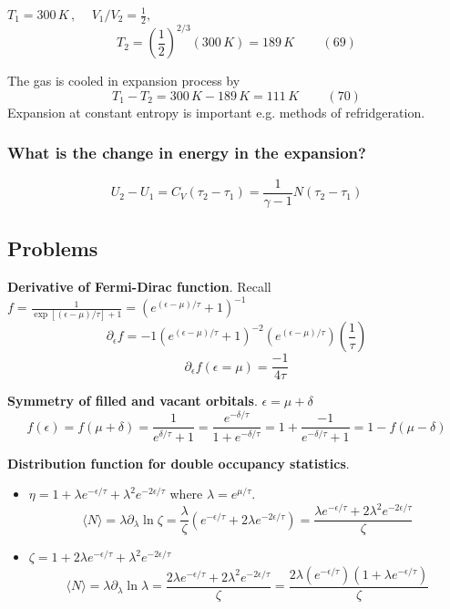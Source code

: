 $T_1 = 300 \, K \, , \quad \,  V_1/V_2 = \frac{1}{2}, \, \quad $ 
\begin{equation}
T_2 = \left( \frac{1}{2} \right)^{2/3} (300 \, K) = 189 \, K \quad \quad \, (69)
\end{equation}

The gas is cooled in expansion process by 
\begin{equation}
T_1 - T_2 = 300 \, K - 189 \, K = 111 \, K \quad \quad \, (70)
\end{equation}
Expansion at constant entropy is important e.g. methods of refridgeration.  

\subsubsection*{What is the change in energy in the expansion?}

\[
U_2 - U_1 = C_V(\tau_2- \tau_1) = \frac{1}{ \gamma -1 } N(\tau_2 - \tau_1)
\]



\subsection*{Problems}

 \textbf{Derivative of Fermi-Dirac function}.  Recall $ f = \frac{1}{ \exp{ [(\epsilon - \mu )/\tau] } + 1 } = (e^{(\epsilon-\mu)/\tau} + 1 )^{-1}$  
\[
\partial_{\epsilon}f = -1 (e^{ (\epsilon - \mu )/\tau } + 1)^{-2} ( e^{ (\epsilon - \mu)/\tau } ) \left( \frac{1}{\tau} \right)
\]
\[
\partial_{\epsilon}f(\epsilon = \mu) = \frac{-1}{4\tau}
\]



 \textbf{Symmetry of filled and vacant orbitals}.   $\epsilon = \mu + \delta$
\[
f(\epsilon) = f(\mu + \delta) = \frac{1 }{ e^{\delta/\tau} + 1 } = \frac{e^{-\delta /\tau } }{ 1 + e^{-\delta/\tau} } = 1 + \frac{-1}{ e^{-\delta/\tau} + 1 }  = 1 - f(\mu - \delta)
\]





 \textbf{Distribution function for double occupancy statistics}.   \begin{itemize}
\item[(a)]
$ \eta = 1 + \lambda e^{-\epsilon/\tau} + \lambda^2 e^{-2\epsilon/\tau}$ where $\lambda = e^{\mu/\tau}$.  
\[
\langle N \rangle = \lambda \partial_{\lambda} \ln{\zeta} = \frac{\lambda}{ \zeta} ( e^{-\epsilon/\tau} + 2\lambda e^{-2\epsilon/\tau} ) = \frac{ \lambda e^{-\epsilon/\tau} + 2 \lambda^2 e^{-2\epsilon/\tau} }{\zeta}
\]
\item[(b)] $\zeta = 1 + 2 \lambda e^{-\epsilon/\tau} + \lambda^2 e^{-2\epsilon/\tau}$
\[
\langle N \rangle = \lambda \partial_{\lambda} \ln{\lambda} = \frac{ 2 \lambda e^{-\epsilon/\tau} + 2\lambda^2 e^{ - 2\epsilon/\tau} }{ \zeta} = \frac{ 2\lambda (e^{-\epsilon/\tau} ) (1 + \lambda e^{-\epsilon/\tau} ) }{ \zeta}
\]
\end{itemize}


